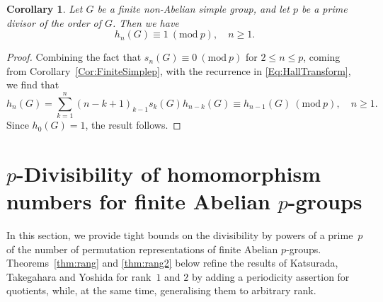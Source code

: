 \documentclass[12pt,reqno]{amsart}
\numberwithin{equation}{section}
\newtheorem{corollary}[theorem]{Corollary}
\theoremstyle{remark}
\begin{document}
\begin{corollary}
Let\/ $G$ be a finite non-Abelian simple group, and let $p$ be a prime divisor
of the order of $G$. Then we have 
\[
h_n(G) \equiv 1~(\mathrm{mod}~p),\quad n\geq1.
\]
\end{corollary}

\begin{proof}
Combining the fact that $s_n(G) \equiv 0~(\mathrm{mod}~p)$ for
$2\leq n\leq p$, coming from Corollary~\ref{Cor:FiniteSimplep}, with
the recurrence in \eqref{Eq:HallTransform}, we find that 
\[
h_n(G) = \sum_{k=1}^n ( n-k+1)_{k-1} s_k(G) h_{n-k}(G)
\equiv h_{n-1}(G)~(\mathrm{mod}~p),\quad n\geq1.
\]
Since $h_0(G) = 1$, the result follows.
\end{proof}

\section{$p$-Divisibility of homomorphism numbers for 
finite Abelian $p$-groups}
\label{sec:Abel}

\noindent In this section, we provide tight bounds on the divisibility
by powers of a prime~$p$ of the number of permutation representations 
of finite Abelian $p$-groups. Theorems~\ref{thm:rang} and
\ref{thm:rang2} below
refine the results of Katsurada, Takegahara and Yoshida
\cite[Theorems~1.2--1.4]{KaTYAA} for rank~$1$ and $2$
by adding a periodicity assertion for quotients, 
while, at the same time, generalising them to arbitrary rank.
\end{document}
